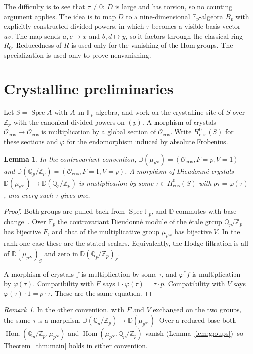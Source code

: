 \documentclass[11pt]{amsart}
\newtheorem{lemma}[theorem]{Lemma}
\theoremstyle{remark}
\newtheorem{remark}[theorem]{Remark}
\newcommand{\Fp}{\mathbb{F}_p}
\newcommand{\Zp}{\mathbb{Z}_p}
\newcommand{\Qp}{\mathbb{Q}_p}
\newcommand{\D}{\mathbb{D}}
\newcommand{\Ocris}{\mathcal{O}_{\mathrm{cris}}}
\newcommand{\cris}{\mathrm{cris}}
\newcommand{\Hom}{\operatorname{Hom}}
\newcommand{\Spec}{\operatorname{Spec}}
\newcommand{\mup}{\mu_{p^\infty}}
\newcommand{\QZ}{\Qp/\Zp}
\begin{document}
The difficulty is to see that $\tau\neq0$: $D$ is large and has torsion, so no counting argument applies. The idea is
to map $D$ to a nine-dimensional $\Fp$-algebra $B_p$ with explicitly constructed divided powers, in which $\tau$
becomes a visible basis vector~$uv$. The map sends $a,c\mapsto x$ and $b,d\mapsto y$, so it factors through the
classical ring $R_0$. Reducedness of $R$ is used only for the vanishing of the Hom groups. The specialization is used
only to prove nonvanishing.

\section{Crystalline preliminaries}

Let $S=\Spec A$ with $A$ an $\Fp$-algebra, and work on the crystalline site of $S$ over $\Zp$ with the canonical
divided powers on $(p)$. A morphism of crystals $\Ocris\to\Ocris$ is multiplication by a global section of $\Ocris$.
Write $H^0_\cris(S)$ for these sections and $\varphi$ for the endomorphism induced by absolute Frobenius.

\begin{lemma}\label{lem:hom}
In the contravariant convention, $\D(\mup)=(\Ocris,F=p,V=1)$ and $\D(\QZ)=(\Ocris,F=1,V=p)$. A morphism of Dieudonn\'e
crystals $\D(\mup)\to\D(\QZ)$ is multiplication by some $\tau\in H^0_\cris(S)$ with $p\tau=\varphi(\tau)$, and every such
$\tau$ gives one.
\end{lemma}

\begin{proof}
Both groups are pulled back from $\Spec\Fp$, and $\D$ commutes with base change~\cite{BBM}. Over $\Fp$ the
contravariant Dieudonn\'e module of the \'etale group $\QZ$ has bijective $F$, and that of the multiplicative group
$\mup$ has bijective $V$. In the rank-one case these are the stated scalars. Equivalently, the Hodge filtration is all
of $\D(\mup)_S$ and zero in $\D(\QZ)_S$.

A morphism of crystals $f$ is multiplication by some $\tau$, and $\varphi^*f$ is multiplication by $\varphi(\tau)$.
Compatibility with $F$ says $1\cdot\varphi(\tau)=\tau\cdot p$. Compatibility with $V$ says $\varphi(\tau)\cdot1=p\cdot\tau$.
These are the same equation.
\end{proof}

\begin{remark}\label{rem:convention}
In the other convention, with $F$ and $V$ exchanged on the two groups, the same $\tau$ is a morphism $\D(\QZ)\to\D(\mup)$.
Over a reduced base both $\Hom(\QZ,\mup)$ and $\Hom(\mup,\QZ)$ vanish (Lemma~\ref{lem:groups}), so Theorem~\ref{thm:main}
holds in either convention.
\end{remark}
\end{document}

